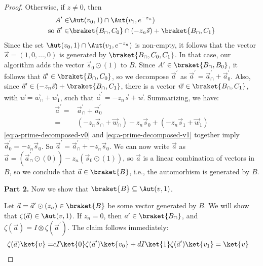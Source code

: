 \begin{proof}
	Otherwise, if $z\ne 0$, then
	\begin{align}
		A^\prime\in & \Aut(v_0,1)\cap \Aut(v_1,e^{-z_n}) \\
		\text{so }\vec a^\prime \in & \braket{B_\cap,C_0}\cap (-z_n\vec s)+\braket{B_\cap, C_1}
	\end{align}
	Since the set $\Aut(v_0,1)\cap \Aut(v_1,e^{-z_n})$ is non-empty, it follows that the vector $\vec s=(1,0,\ldots,0)$ is generated by $\braket{B_\cap,C_0,C_1}$.
	In that case, our algorithm adds the vector $\vec s_0 \odot(1)$ to $B$.
	Since $A^\prime\in \braket{B_\cap,B_0}$, it follows that $\vec a^\prime\in \braket{B_\cap, C_0}$, so we decompose $\vec a^\prime$ as $\vec a^\prime = \vec a_\cap^\prime + \vec a_0^\prime$.
	Also, since $\vec a^\prime\in (-z_n\vec s)+\braket{B_\cap, C_1}$, there is a vector $\vec w\in \braket{B_\cap, C_1}$, with $\vec w = \vec w_\cap + \vec w_1$, such that $\vec a^\prime= -z_n\vec s + \vec w$.
	Summarizing, we have:
	\begin{align}
		\label{eq:a-prime-decomposed-v0}
		\vec a^\prime  = & \vec a_\cap^\prime + \vec a_0^\prime \\
		\label{eq:a-prime-decomposed-v1}
		= & (-z_n\vec s_\cap + \vec w_\cap)  -z_n\vec s_0 +(-z_n\vec s_1 + \vec w_1)
	\end{align}
	\autoref{eq:a-prime-decomposed-v0} and \autoref{eq:a-prime-decomposed-v1} together imply $\vec a_0^\prime = -z_n\vec s_0$.
	So $\vec a^\prime = \vec a_\cap^\prime + -z_n\vec s_0$.
	We can now write $\vec a$ as $\vec a = (\vec a_\cap^\prime\odot (0)) -z_n(\vec s_0\odot (1))$, so $\vec a$ is a linear combination of vectors in $B$, so we conclude that $\vec a\in \braket{B}$, i.e., the automorhism is generated by $B$.
	
	\textbf{Part 2. } Now we show that $\braket{B}\subseteq \Aut(v,1)$.

	Let $\vec a=\vec a^\prime \odot (z_n)\in \braket{B}$ be some vector generated by $B$.
	We will show that $\zeta(\vec a)\in \Aut(v,1)$.
	If $z_n=0$, then $a^\prime\in \braket{B_\cap}$, and $\zeta(\vec a)=I\otimes \zeta(\vec a^\prime)$.
	The claim follows immediately:
	\begin{align}
		\zeta(\vec a)\ket{v} = & cI\ket{0}\zeta(\vec a^\prime)\ket{v_0}+dI\ket{1}\zeta(\vec a^\prime)\ket{v_1} = \ket{v}
	\end{align}
	

\end{proof}
